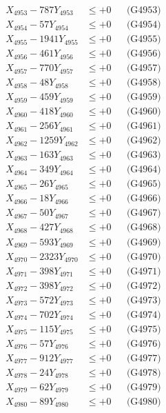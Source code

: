 \documentclass[a4paper,10pt]{article}
\begin{document}
{\begin{align}
X_{4953} - 787Y_{4953} &\leq +0 && \text{(G4953)} \\
X_{4954} - 57Y_{4954} &\leq +0 && \text{(G4954)} \\
X_{4955} - 1941Y_{4955} &\leq +0 && \text{(G4955)} \\
X_{4956} - 461Y_{4956} &\leq +0 && \text{(G4956)} \\
X_{4957} - 770Y_{4957} &\leq +0 && \text{(G4957)} \\
X_{4958} - 48Y_{4958} &\leq +0 && \text{(G4958)} \\
X_{4959} - 459Y_{4959} &\leq +0 && \text{(G4959)} \\
X_{4960} - 418Y_{4960} &\leq +0 && \text{(G4960)} \\
\allowbreak
X_{4961} - 256Y_{4961} &\leq +0 && \text{(G4961)} \\
X_{4962} - 1259Y_{4962} &\leq +0 && \text{(G4962)} \\
X_{4963} - 163Y_{4963} &\leq +0 && \text{(G4963)} \\
X_{4964} - 349Y_{4964} &\leq +0 && \text{(G4964)} \\
X_{4965} - 26Y_{4965} &\leq +0 && \text{(G4965)} \\
X_{4966} - 18Y_{4966} &\leq +0 && \text{(G4966)} \\
X_{4967} - 50Y_{4967} &\leq +0 && \text{(G4967)} \\
X_{4968} - 427Y_{4968} &\leq +0 && \text{(G4968)} \\
X_{4969} - 593Y_{4969} &\leq +0 && \text{(G4969)} \\
X_{4970} - 2323Y_{4970} &\leq +0 && \text{(G4970)} \\
\allowbreak
X_{4971} - 398Y_{4971} &\leq +0 && \text{(G4971)} \\
X_{4972} - 398Y_{4972} &\leq +0 && \text{(G4972)} \\
X_{4973} - 572Y_{4973} &\leq +0 && \text{(G4973)} \\
X_{4974} - 702Y_{4974} &\leq +0 && \text{(G4974)} \\
X_{4975} - 115Y_{4975} &\leq +0 && \text{(G4975)} \\
X_{4976} - 57Y_{4976} &\leq +0 && \text{(G4976)} \\
X_{4977} - 912Y_{4977} &\leq +0 && \text{(G4977)} \\
X_{4978} - 24Y_{4978} &\leq +0 && \text{(G4978)} \\
X_{4979} - 62Y_{4979} &\leq +0 && \text{(G4979)} \\
X_{4980} - 89Y_{4980} &\leq +0 && \text{(G4980)} \\

\end{align}}
\end{document}
